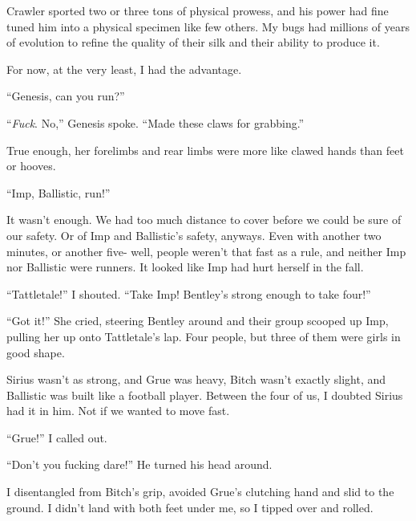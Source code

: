 Crawler sported two or three tons of physical prowess, and his power had fine tuned him into a physical specimen like few others.  My bugs had millions of years of evolution to refine the quality of their silk and their ability to produce it.



For now, at the very least, I had the advantage.



``Genesis, can you run?''



``\emph{Fuck}.  No,'' Genesis spoke.  ``Made these claws for grabbing.''



True enough, her forelimbs and rear limbs were more like clawed hands than feet or hooves.



``Imp, Ballistic, run!''



It wasn't enough.  We had too much distance to cover before we could be sure of our safety.  Or of Imp and Ballistic's safety, anyways.  Even with another two minutes, or another five- well, people weren't that fast as a rule, and neither Imp nor Ballistic were runners.  It looked like Imp had hurt herself in the fall.



``Tattletale!''  I shouted.  ``Take Imp!  Bentley's strong enough to take four!''



``Got it!''  She cried, steering Bentley around and their group scooped up Imp, pulling her up onto Tattletale's lap.  Four people, but three of them were girls in good shape.



Sirius wasn't as strong, and Grue was heavy, Bitch wasn't exactly slight, and Ballistic was built like a football player.  Between the four of us, I doubted Sirius had it in him.  Not if we wanted to move fast.



``Grue!''  I called out.



``Don't you fucking dare!''  He turned his head around.



I disentangled from Bitch's grip, avoided Grue's clutching hand and slid to the ground.  I didn't land with both feet under me, so I tipped over and rolled.



